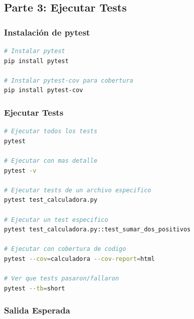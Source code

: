 \documentclass[12pt,a4paper]{article}
\begin{document}
\newpage

\subsection{Parte 3: Ejecutar Tests}

\subsubsection{Instalación de pytest}

\begin{lstlisting}[language=bash, caption=Instalacion de pytest]
# Instalar pytest
pip install pytest

# Instalar pytest-cov para cobertura
pip install pytest-cov
\end{lstlisting}

\subsubsection{Ejecutar Tests}

\begin{lstlisting}[language=bash, caption=Comandos de pytest]
# Ejecutar todos los tests
pytest

# Ejecutar con mas detalle
pytest -v

# Ejecutar tests de un archivo especifico
pytest test_calculadora.py

# Ejecutar un test especifico
pytest test_calculadora.py::test_sumar_dos_positivos

# Ejecutar con cobertura de codigo
pytest --cov=calculadora --cov-report=html

# Ver que tests pasaron/fallaron
pytest --tb=short
\end{lstlisting}

\subsubsection{Salida Esperada}
\end{document}
